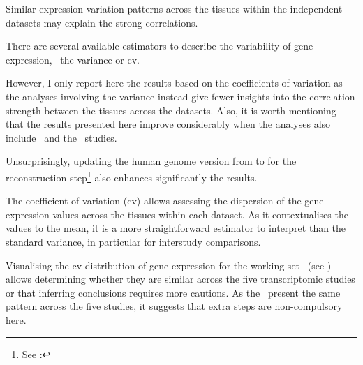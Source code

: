 Similar expression variation patterns across the tissues
within the independent datasets may explain the strong correlations.

There are several available estimators to describe
the variability of gene expression,
\eg\ the variance or \gls{cv}.

However,
I only report here the results based on the coefficients of variation
as the analyses involving the variance instead give
fewer insights into the correlation strength
between the tissues across the datasets.
Also, it is worth mentioning that the results presented here
improve considerably when the analyses also include \uhlen\ and the \gtex\ studies.
\begin{comment}
Indeed, preliminary results (only based on \castle, \vt\ and \ibm\ studies)
were far worse.
\end{comment}
Unsurprisingly, updating the human genome version from  to 
for the reconstruction
step\footnote{See : }
also enhances significantly the results.

The coefficient of variation (\gls{cv}) allows assessing
the dispersion of the gene expression values
across the tissues within each dataset.
As it contextualises the values to the mean,
it is a more straightforward estimator to interpret than
the standard variance,
in particular for interstudy comparisons.

Visualising the \gls{cv} distribution of
gene expression for the working set \setOne\ (see )
allows determining whether they are similar across the five transcriptomic studies
or that inferring conclusions requires more cautions.
As the \cvs\ present the same pattern across the five studies,
it suggests that extra steps are non-compulsory here.

